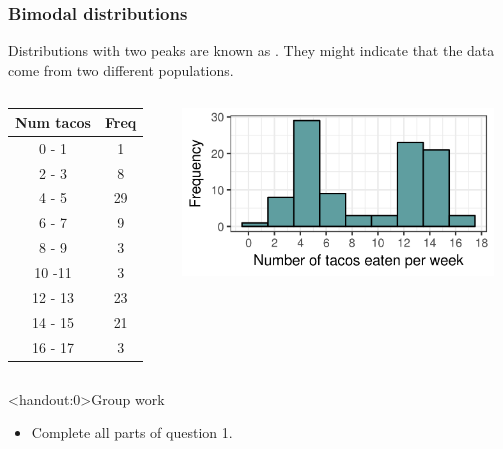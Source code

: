 \documentclass[xcolor=table, aspectratio=169, bigger, handout]{beamer}
\begin{document}
\begin{frame}
\frametitle{Bimodal distributions}
\begin{block}{}
Distributions with two peaks are known as . They might indicate that the data come from two different populations.
\end{block}
\pause
\begin{columns}
\begin{column}{0.35\textwidth}
\begin{exampleblock}{}
\begin{center}
\begin{tabular}{cc}
Num tacos & Freq \\
\hline
0 - 1 & 1 \\
2 - 3 & 8 \\
4 - 5 & 29 \\
6 - 7 & 9 \\
8 - 9 & 3 \\
10 -11 & 3 \\
12 - 13 & 23 \\
14 - 15 & 21 \\
16 - 17 & 3 \\
\end{tabular}
\end{center}
\end{exampleblock}
\end{column}
\pause
\begin{column}{0.65\textwidth}
\begin{center}
\includegraphics[width=3.25in]{../images/wk04_taco_bi_hist}

\end{center}
\end{column}
\end{columns}
\end{frame}

\begin{frame}<handout:0>{Group work}
\begin{block}{}
\begin{itemize}
\item Complete all parts of question 1.
\end{itemize}
\end{block}
\end{frame}
\end{document}
